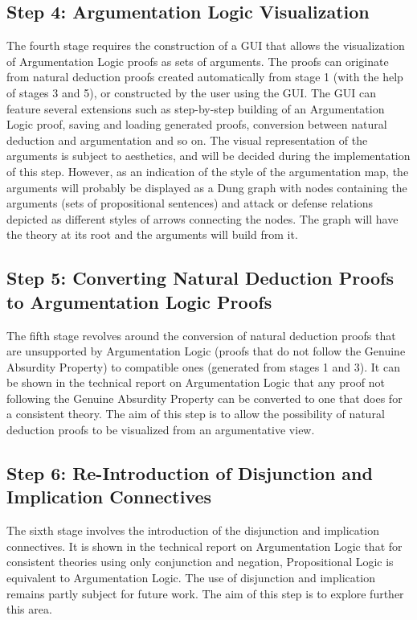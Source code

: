 \documentclass[11pt,twoside,a4paper]{report}
\begin{document}
\subsection{Step 4: Argumentation Logic Visualization}
The fourth stage requires the construction of a GUI that allows the visualization of Argumentation Logic proofs as sets of arguments. The proofs can originate from natural deduction proofs created automatically from stage 1 (with the help of stages 3 and 5), or constructed by the user using the GUI. The GUI can feature several extensions such as step-by-step building of an Argumentation Logic proof, saving and loading generated proofs, conversion between natural deduction and argumentation and so on. The visual representation of the arguments is subject to aesthetics, and will be decided during the implementation of this step. However, as an indication of the style of the argumentation map, the arguments will probably be displayed as a Dung graph with nodes containing the arguments (sets of propositional sentences) and attack or defense relations depicted as different styles of arrows connecting the nodes. The graph will have the theory at its root and the arguments will build from it. 

\subsection{Step 5: Converting Natural Deduction Proofs to Argumentation Logic Proofs}
The fifth stage revolves around the conversion of natural deduction proofs that are unsupported by Argumentation Logic (proofs that do not follow the Genuine Absurdity Property) to compatible ones (generated from stages 1 and 3). It can be shown in the technical report on Argumentation Logic that any proof not following the Genuine Absurdity Property can be converted to one that does for a consistent theory. The aim of this step is to allow the possibility of natural deduction proofs to be visualized from an argumentative view.

\subsection{Step 6: Re-Introduction of Disjunction and Implication Connectives}
The sixth stage involves the introduction of the disjunction and implication connectives. It is shown in the technical report on Argumentation Logic that for consistent theories using only conjunction and negation, Propositional Logic is equivalent to Argumentation Logic. The use of disjunction and implication remains partly subject for future work. The aim of this step is to explore further this area.
\end{document}

